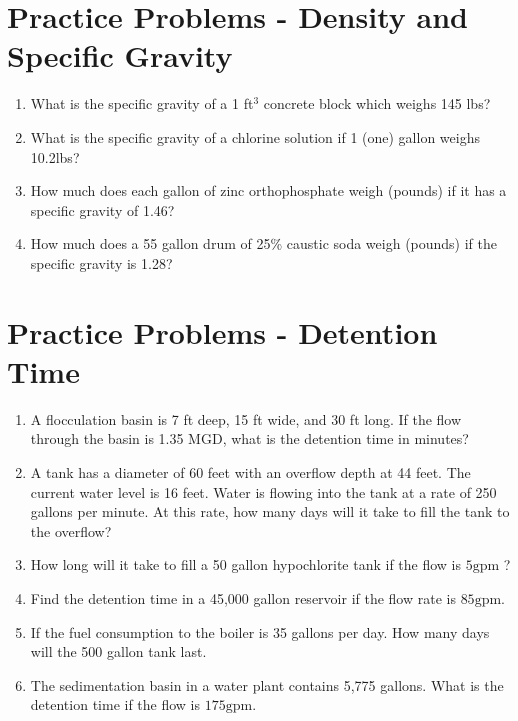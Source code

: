 \vspace{1cm}
\section*{Practice Problems - Density and Specific Gravity}
\begin{enumerate}

\item What is the specific gravity of a 1 ft$^3$ concrete block which weighs 145 lbs?

\item What is the specific gravity of a chlorine solution if 1 (one) gallon weighs 10.2lbs?

\item How much does each gallon of zinc orthophosphate weigh (pounds) if it has a specific gravity of 1.46?

\item How much does a 55 gallon drum of 25\% caustic soda weigh (pounds) if the specific gravity is 1.28?

\end{enumerate}

\section*{Practice Problems - Detention Time}
\begin{enumerate}
\item A flocculation basin is 7 ft deep, 15 ft wide, and 30 ft long. If the flow through the basin is 1.35 MGD, what is the detention time in minutes?

\item A tank has a diameter of 60 feet with an overflow depth at 44 feet. The current water level is 16 feet. Water is flowing into the tank at a rate of 250 gallons per minute. At this rate, how many days will it take to fill the tank to the overflow?

\item How long will it take to fill a 50 gallon hypochlorite tank if the flow is $5 \mathrm{gpm}$ ?

\item Find the detention time in a 45,000 gallon reservoir if the flow rate is $85 \mathrm{gpm}$.

\item If the fuel consumption to the boiler is 35 gallons per day. How many days will the 500 gallon tank last.

\item The sedimentation basin in a water plant contains 5,775 gallons. What is the detention time if the flow is $175 \mathrm{gpm}$.
\end{enumerate}

